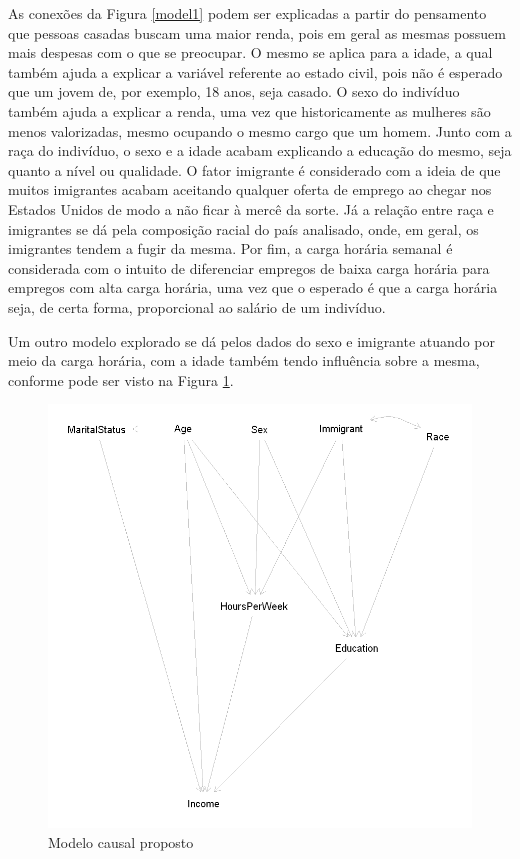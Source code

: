 \documentclass[11pt,letterpaper,twocolumn]{article}
\begin{document}
As conexões da Figura \ref{model1} podem ser explicadas a partir do pensamento que pessoas casadas buscam uma maior renda, pois em geral as mesmas possuem mais despesas com o que se preocupar. O mesmo se aplica para a idade, a qual também ajuda a explicar a variável referente ao estado civil, pois não é esperado que um jovem de, por exemplo, 18 anos, seja casado. O sexo do indivíduo também ajuda a explicar a renda, uma vez que historicamente as mulheres são menos valorizadas, mesmo ocupando o mesmo cargo que um homem. Junto com a raça do indivíduo, o sexo e a idade acabam explicando a educação do mesmo, seja quanto a nível ou qualidade. O fator imigrante é considerado com a ideia de que muitos imigrantes acabam aceitando qualquer oferta de emprego ao chegar nos Estados Unidos de modo a não ficar à mercê da sorte. Já a relação entre raça e imigrantes se dá pela composição racial do país analisado, onde, em geral, os imigrantes tendem a fugir da mesma. Por fim, a carga horária semanal é considerada com o intuito de diferenciar empregos de baixa carga horária para empregos com alta carga horária, uma vez que o esperado é que a carga horária seja, de certa forma, proporcional ao salário de um indivíduo.

Um outro modelo explorado se dá pelos dados do sexo e imigrante atuando por meio da carga horária, com a idade também tendo influência sobre a mesma, conforme pode ser visto na Figura \ref{model2}.
\begin{figure}
    \centering
    \includegraphics[scale = 0.5]{A2/Imagens/model2.png}
    \caption{Modelo causal proposto}
    \label{model2}
\end{figure}
\end{document}
